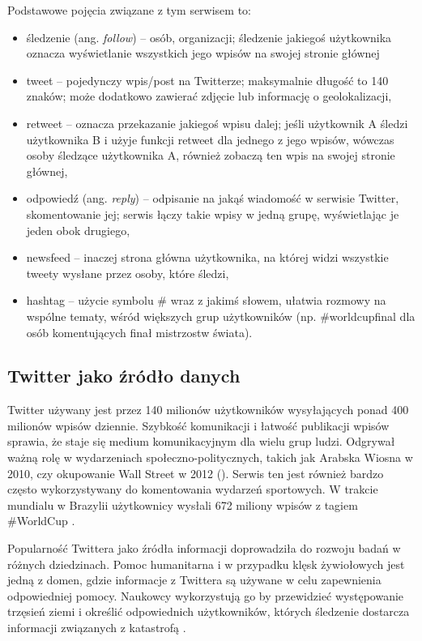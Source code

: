 Podstawowe pojęcia związane z tym serwisem to:
\begin{itemize}
  \item śledzenie (ang. \textit{follow}) -- osób, organizacji; śledzenie jakiegoś
  użytkownika oznacza wyświetlanie wszystkich jego wpisów na swojej stronie
  głównej 
  \item tweet -- pojedynczy wpis/post na Twitterze; maksymalnie długość to 140
  znaków; może dodatkowo zawierać zdjęcie lub informację o geolokalizacji,
  \item retweet -- oznacza przekazanie jakiegoś wpisu dalej; jeśli użytkownik A
  śledzi użytkownika B i użyje funkcji retweet dla jednego z jego wpisów, 
  wówczas osoby śledzące użytkownika A, również zobaczą ten wpis na
  swojej stronie głównej,
  \item odpowiedź (ang. \textit{reply}) -- odpisanie na jakąś wiadomość w serwisie
  Twitter, skomentowanie jej; serwis łączy takie wpisy w jedną grupę, wyświetlając
  je jeden obok drugiego,
  \item newsfeed -- inaczej strona główna użytkownika, na której widzi wszystkie
  tweety wysłane przez osoby, które śledzi,
  \item hashtag -- użycie symbolu \# wraz z jakimś słowem, ułatwia
  rozmowy na wspólne tematy, wśród większych grup użytkowników 
  (np. \#worldcupfinal dla osób komentujących finał mistrzostw świata).
\end{itemize} 

\subsection{Twitter jako źródło danych}
Twitter używany jest przez 140 milionów użytkowników wysyłających ponad 400 
milionów wpisów dziennie. Szybkość komunikacji i łatwość publikacji wpisów
sprawia, że staje się medium komunikacyjnym dla wielu grup ludzi.
Odgrywał ważną rolę w wydarzeniach społeczno-politycznych,
takich jak Arabska Wiosna w 2010, czy okupowanie Wall Street w 2012 
(\cite{TwitterDataAnalytics2013}).
Serwis ten jest również bardzo często wykorzystywany do komentowania wydarzeń
sportowych. W trakcie mundialu w Brazylii użytkownicy wysłali 672 miliony
wpisów z tagiem \#WorldCup \cite{TwitterStatsWorldCup}.

Popularność Twittera jako źródła informacji doprowadziła do rozwoju badań
w różnych dziedzinach. Pomoc humanitarna i w przypadku klęsk żywiołowych
jest jedną z domen, gdzie informacje z Twittera są używane w celu zapewnienia
odpowiedniej pomocy. Naukowcy wykorzystują go by przewidzieć występowanie trzęsień
ziemi i określić odpowiednich użytkowników, których śledzenie dostarcza informacji
związanych z katastrofą \cite{TwitterDataAnalytics2013}.

